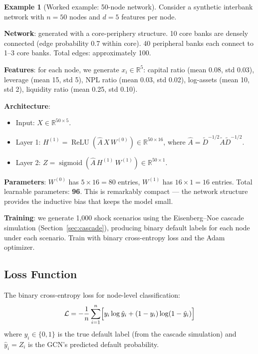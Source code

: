 \documentclass[11pt, a4paper]{article}
\theoremstyle{definition}
\newtheorem{example}{Example}[section]
\theoremstyle{plain}
\theoremstyle{remark}
\newcommand{\RV}{\mathbb{R}}
\newcommand{\sigmoid}{\operatorname{sigmoid}}
\newcommand{\ReLU}{\operatorname{ReLU}}
\begin{document}
\begin{example}[Worked example: 50-node network]\label{ex:50-node}
Consider a synthetic interbank network with $n = 50$ nodes and $d = 5$ features
per node.

\textbf{Network}: generated with a core-periphery structure.
10 core banks are densely connected (edge probability 0.7 within core).
40 peripheral banks each connect to 1--3 core banks.
Total edges: approximately 100.

\textbf{Features}: for each node, we generate $x_i \in \RV^5$:
capital ratio (mean 0.08, std 0.03), leverage (mean 15, std 5),
NPL ratio (mean 0.03, std 0.02), log-assets (mean 10, std 2),
liquidity ratio (mean 0.25, std 0.10).

\textbf{Architecture}:
\begin{itemize}
    \item Input: $X \in \RV^{50 \times 5}$.
    \item Layer 1: $H^{(1)} = \ReLU(\hat{A}\, X\, W^{(0)}) \in \RV^{50 \times 16}$,
          where $\hat{A} = \tilde{D}^{-1/2}\tilde{A}\tilde{D}^{-1/2}$.
    \item Layer 2: $Z = \sigmoid(\hat{A}\, H^{(1)}\, W^{(1)}) \in \RV^{50 \times 1}$.
\end{itemize}

\textbf{Parameters}: $W^{(0)}$ has $5 \times 16 = 80$ entries, $W^{(1)}$ has
$16 \times 1 = 16$ entries.
Total learnable parameters: \textbf{96}.
This is remarkably compact --- the network structure provides the inductive bias
that keeps the model small.

\textbf{Training}: we generate 1{,}000 shock scenarios using the Eisenberg--Noe
cascade simulation (Section~\ref{sec:cascade}), producing binary default labels
for each node under each scenario.
Train with binary cross-entropy loss and the Adam optimizer.
\end{example}

\subsection{Loss Function}

The binary cross-entropy loss for node-level classification:
\begin{equation}\label{eq:bce}
    \mathcal{L} = -\frac{1}{n}\sum_{i=1}^{n}\Bigl[y_i \log \hat{y}_i + (1 - y_i)\log(1 - \hat{y}_i)\Bigr]
\end{equation}
where $y_i \in \{0, 1\}$ is the true default label (from the cascade simulation)
and $\hat{y}_i = Z_i$ is the GCN's predicted default probability.
\end{document}
